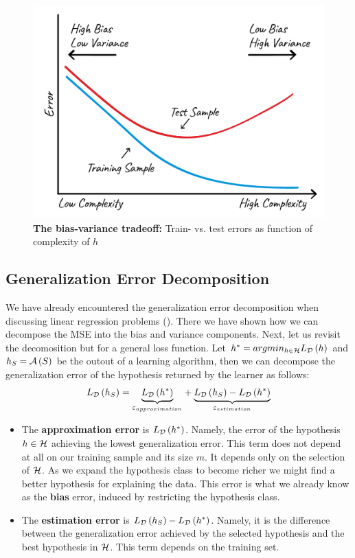 \begin{figure}[h!]
\centering
\includegraphics[width=4.5in]{chapters/ensemble.methods/figures/bias_variance.png}  
\caption{\textbf{The bias-variance tradeoff:} Train- vs. test errors as function of complexity of $h$}
\end{figure}

\subsection{Generalization Error Decomposition}
We have already encountered the generalization error decomposition when discussing linear regression problems (). There we have shown how we can decompose the MSE into the bias and variance components. Next, let us revisit the decomosition but for a general loss function. Let $h^{*}=argmin_{h\in\mathcal{H}} L_{\mathcal{D}}\left(h\right)$ and $h_S=\mathcal{A}\left(S\right)$ be the outout of a learning algorithm, then we can decompose the generalization error of the hypothesis returned by the learner as follows: 
\begin{equation}
L_{\mathcal{D}}\left(h_S\right) = \underset{\varepsilon_{approximation}}{\underbrace{L_{\mathcal{D}}\left(h^{*}\right)}} + \underset{\varepsilon_{estimation}} {\underbrace{L_{\mathcal{D}}\left(h_{S}\right)-L_{\mathcal{D}}\left(h^{*}\right)}}
\label{eqn:error_decomposition}
\end{equation}

\begin{itemize}
	\item The \textbf{approximation error} is $L_{\mathcal{D}}\left(h^*\right)$. Namely, the error of the hypothesis $h\in\mathcal{H}$ achieving the lowest generalization error. This term does not depend at all on our training sample and its size $m$. It depends only on the selection of $\mathcal{H}$. As we expand the hypothesis class to become richer we might find a better hypothesis for explaining the data. This error is what we already know as the \textbf{bias} error, induced by restricting the hypothesis class.
	\item The \textbf{estimation error} is $L_{\mathcal{D}}\left(h_{S}\right)-L_{\mathcal{D}}\left(h^{*}\right)$. Namely, it is the difference between the generalization error achieved by the selected hypothesis and the best hypothesis in $\mathcal{H}$. This term depends on the training set. 
\end{itemize}        

